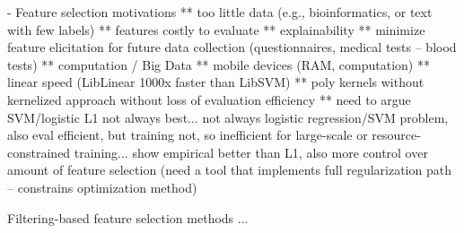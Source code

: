 - Feature selection motivations
** too little data (e.g., bioinformatics, or text with few labels)
** features costly to evaluate
** explainability
** minimize feature elicitation for future data collection (questionnaires, medical tests -- blood tests)
** computation / Big Data
** mobile devices (RAM, computation)
** linear speed (LibLinear 1000x faster than LibSVM)
** poly kernels without kernelized approach without loss of evaluation efficiency
** need to argue SVM/logistic L1 not always best... not always logistic regression/SVM problem, also eval efficient, but training not, so 
inefficient for large-scale or resource-constrained training... show empirical better than L1, also more control over amount of feature 
selection (need a tool that implements full regularization path -- constrains optimization method)


Filtering-based feature selection methods ...


